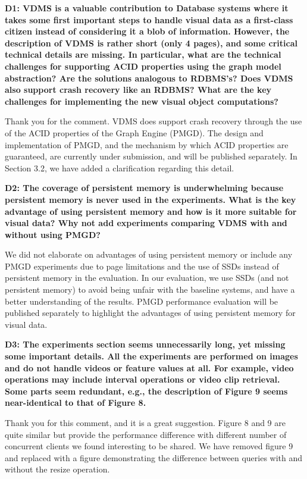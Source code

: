 \documentclass[11pt]{proposalnsf}
\begin{document}
\noindent %
\textbf{
D1: VDMS is a valuable contribution to Database systems where it takes
some first important steps to handle visual data as a first-class citizen
instead of considering it a blob of information. However, the description
of VDMS is rather short (only 4 pages), and some critical technical
details are missing. In particular, what are the technical challenges
for supporting ACID properties using the graph model abstraction? Are
the solutions analogous to RDBMS’s? Does VDMS also support crash
recovery like an RDBMS? What are the key challenges for implementing
the new visual object computations?
}\bigskip

Thank you for the comment.
VDMS does support crash recovery through the use of the ACID properties
of the Graph Engine (PMGD).
The design and implementation of PMGD, and the mechanism by which ACID properties
are guaranteed, are currently under submission, and will be published separately.
In Section 3.2, we have added a clarification regarding this detail.

\bigskip
\noindent %
\textbf{
D2: The coverage of persistent memory is underwhelming because persistent memory
is never used in the experiments.
What is the key advantage of using persistent memory and how is it
more suitable for visual data? Why not add experiments comparing VDMS with
and without using PMGD?
}\bigskip

We did not elaborate on advantages of using persistent memory or include
any PMGD experiments due to page limitations and the use of SSDs
instead of persistent memory in the evaluation.
In our evaluation, we use SSDs (and not persistent memory) to avoid
being unfair with the baseline systems, and have a better understanding of
the results.
PMGD performance evaluation will be published separately to highlight
the advantages of using persistent memory for visual data.

\bigskip
\noindent %
\textbf{
D3: The experiments section seems unnecessarily long, yet missing some important
details. All the experiments are performed on images and do not handle videos or feature
values at all. For example, video operations may include interval operations or video
clip retrieval. Some parts seem redundant, e.g., the description of Figure 9 seems
near-identical to that of Figure 8.
}\bigskip

Thank you for this comment, and it is a great suggestion.
Figure 8 and 9 are quite similar but provide the performance difference with different
number of concurrent clients we found interesting to be shared.
We have removed figure 9 and replaced with a figure
demonstrating the difference between queries with and without the resize operation.
\end{document}
